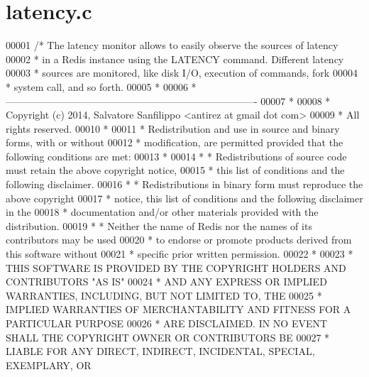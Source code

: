 \hypertarget{latency_8c_source}{}\section{latency.\+c}
\label{latency_8c_source}

\begin{DoxyCode}
00001 \textcolor{comment}{/* The latency monitor allows to easily observe the sources of latency}
00002 \textcolor{comment}{ * in a Redis instance using the LATENCY command. Different latency}
00003 \textcolor{comment}{ * sources are monitored, like disk I/O, execution of commands, fork}
00004 \textcolor{comment}{ * system call, and so forth.}
00005 \textcolor{comment}{ *}
00006 \textcolor{comment}{ * ----------------------------------------------------------------------------}
00007 \textcolor{comment}{ *}
00008 \textcolor{comment}{ * Copyright (c) 2014, Salvatore Sanfilippo <antirez at gmail dot com>}
00009 \textcolor{comment}{ * All rights reserved.}
00010 \textcolor{comment}{ *}
00011 \textcolor{comment}{ * Redistribution and use in source and binary forms, with or without}
00012 \textcolor{comment}{ * modification, are permitted provided that the following conditions are met:}
00013 \textcolor{comment}{ *}
00014 \textcolor{comment}{ *   * Redistributions of source code must retain the above copyright notice,}
00015 \textcolor{comment}{ *     this list of conditions and the following disclaimer.}
00016 \textcolor{comment}{ *   * Redistributions in binary form must reproduce the above copyright}
00017 \textcolor{comment}{ *     notice, this list of conditions and the following disclaimer in the}
00018 \textcolor{comment}{ *     documentation and/or other materials provided with the distribution.}
00019 \textcolor{comment}{ *   * Neither the name of Redis nor the names of its contributors may be used}
00020 \textcolor{comment}{ *     to endorse or promote products derived from this software without}
00021 \textcolor{comment}{ *     specific prior written permission.}
00022 \textcolor{comment}{ *}
00023 \textcolor{comment}{ * THIS SOFTWARE IS PROVIDED BY THE COPYRIGHT HOLDERS AND CONTRIBUTORS "AS IS"}
00024 \textcolor{comment}{ * AND ANY EXPRESS OR IMPLIED WARRANTIES, INCLUDING, BUT NOT LIMITED TO, THE}
00025 \textcolor{comment}{ * IMPLIED WARRANTIES OF MERCHANTABILITY AND FITNESS FOR A PARTICULAR PURPOSE}
00026 \textcolor{comment}{ * ARE DISCLAIMED. IN NO EVENT SHALL THE COPYRIGHT OWNER OR CONTRIBUTORS BE}
00027 \textcolor{comment}{ * LIABLE FOR ANY DIRECT, INDIRECT, INCIDENTAL, SPECIAL, EXEMPLARY, OR}

\end{DoxyCode}
